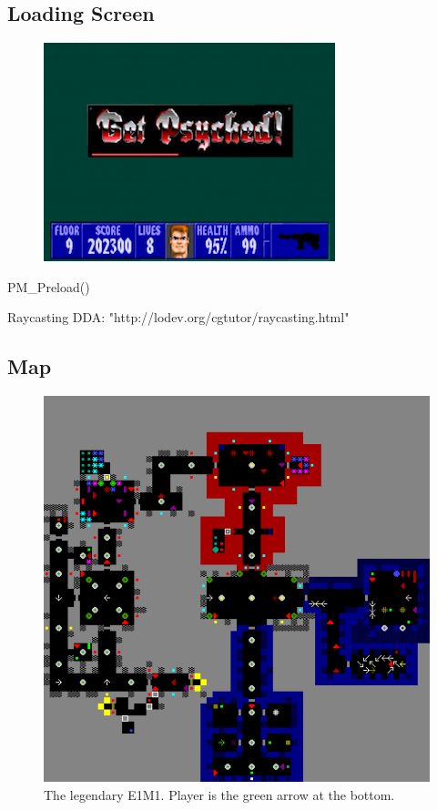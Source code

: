 \documentclass[book.tex]{subfiles}
\begin{document}
\subsection{Loading Screen}
\begin{figure}[H]
  \centering
 \includegraphics[scale=1.3]{imgs/get_psyched.png}
\end{figure}
PM\_Preload()

Raycasting DDA: "http://lodev.org/cgtutor/raycasting.html"

\subsection{Map}
\begin{figure}[H]
  \centering
 \includegraphics[scale=1.0]{imgs/e1m1.png}
 \caption{The legendary E1M1. Player is the green arrow at the bottom.}
\end{figure}
\end{document}

